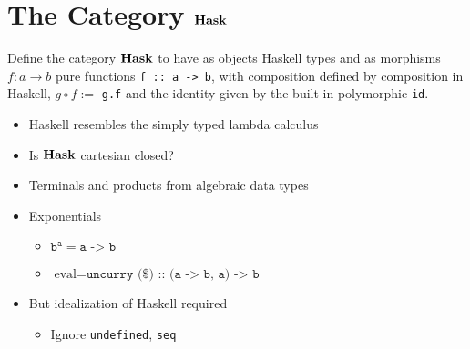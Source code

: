 \section{The Category $\mathbf{Hask}$}

\frame{\tableofcontents[currentsection]}

\begin{frame}[fragile]
    \begin{definition}
        Define the category $\mathbf{Hask}$ to have as objects Haskell types and as
        morphisms $f: a \to b$ pure functions \verb|f :: a -> b|, with
        composition defined by composition in Haskell, $g \circ f :=$
        \verb|g.f| and the identity given by the built-in polymorphic \verb|id|.
    \end{definition}
\end{frame}

\begin{frame}[fragile]
    \begin{itemize}
        \item Haskell resembles the simply typed lambda calculus
        \item Is $\mathbf{Hask}$ cartesian closed?
        \item Terminals and products from algebraic data types
        \item Exponentials
        \begin{itemize}
            \item $\texttt{b}^\texttt{a} = \texttt{a -> b}$
            \item $\textrm{eval} = \texttt{uncurry (\$) :: (a -> b, a) -> b}$
        \end{itemize}
        \item But idealization of Haskell required
        \begin{itemize}
            \item Ignore \verb|undefined|, \verb|seq|
        \end{itemize}
    \end{itemize}
\end{frame}
